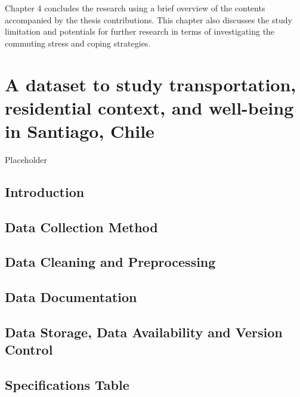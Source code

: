 \documentclass[
11pt, %
oneside, %
english, %
singlespacing, %
]{macthesis} %
\begin{document}
Chapter 4 concludes the research using a brief overview of the contents accompanied by the thesis contributions. This chapter also discusses the study limitation and potentials for further research in terms of investigating the commuting stress and coping strategies.

\hypertarget{a-dataset-to-study-transportation-residential-context-and-well-being-in-santiago-chile}{%
\chapter{A dataset to study transportation, residential context, and well-being in Santiago, Chile}\label{a-dataset-to-study-transportation-residential-context-and-well-being-in-santiago-chile}}

Placeholder

\hypertarget{introduction-2}{%
\section{Introduction}\label{introduction-2}}

\hypertarget{data-collection-method}{%
\section{Data Collection Method}\label{data-collection-method}}

\hypertarget{data-cleaning-and-preprocessing}{%
\section{Data Cleaning and Preprocessing}\label{data-cleaning-and-preprocessing}}

\hypertarget{data-documentation}{%
\section{Data Documentation}\label{data-documentation}}

\hypertarget{data-storage-data-availability-and-version-control}{%
\section{Data Storage, Data Availability and Version Control}\label{data-storage-data-availability-and-version-control}}

\hypertarget{specifications-table}{%
\section{Specifications Table}\label{specifications-table}}
\end{document}
